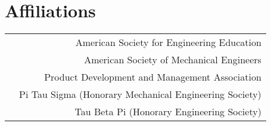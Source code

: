 \section*{Affiliations}
\begin{tabular}{L!{\VRule}R}
&American Society for Engineering Education\\
&American Society of Mechanical Engineers\\
&Product Development and Management Association\\
&Pi Tau Sigma (Honorary Mechanical Engineering Society)\\
&Tau Beta Pi (Honorary Engineering Society)\\
\end{tabular}